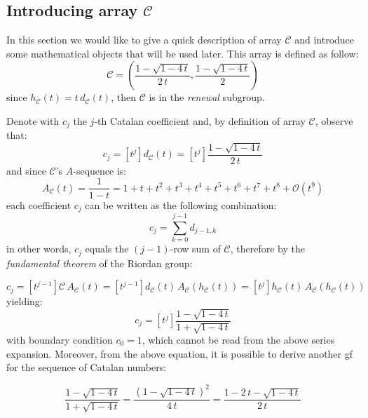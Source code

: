 \subsection{Introducing array $\mathcal{C}$}

In this section we would like to give a quick description of
array $\mathcal{C}$ and introduce some mathematical objects
that will be used later. This array is defined as follow:
\begin{displaymath}
    \mathcal{C}=\left(\frac{1-\sqrt{1-4\,t}}{2\,t},
        \frac{1-\sqrt{1-4\,t}}{2}\right)
\end{displaymath}
since $h_{\mathcal{C}}(t)=t\,d_{\mathcal{C}}(t)$, then $\mathcal{C}$
is in the \emph{renewal} subgroup.

Denote with $c_{j}$ the $j$-th Catalan coefficient and, 
by definition of array $\mathcal{C}$, observe that:
\begin{displaymath}
    c_{j} = [t^{j}]d_{\mathcal{C}}(t)= [t^{j}]\frac{1-\sqrt{1-4\,t}}{2\,t}
\end{displaymath}
and since $\mathcal{C}$'s $A$-sequence is:
\begin{displaymath}
    A_{\mathcal{C}}(t)=\frac{1}{1-t}=1+t+t^{2}+t^{3}+t^{4}+t^{5}+t^{6}+t^{7}+t^{8}+
        \mathcal{O}(t^{9})
\end{displaymath}
each coefficient $c_{j}$ can be written as the following combination:
\begin{displaymath}
    c_{j} = \sum_{k=0}^{j-1}{d_{j-1,k}}
\end{displaymath}
in other words, $c_{j}$ equals the $(j-1)$-row sum of $\mathcal{C}$, 
therefore by the \emph{fundamental theorem} of the Riordan group:

\begin{displaymath}
    c_{j} = [t^{j-1}]\mathcal{C}\,A_{\mathcal{C}}(t)
          = [t^{j-1}]d_{\mathcal{C}}(t)\,A_{\mathcal{C}}(h_{\mathcal{C}}(t))
          = [t^{j}]h_{\mathcal{C}}(t)\,A_{\mathcal{C}}(h_{\mathcal{C}}(t))
\end{displaymath}
yielding:
\begin{displaymath}
    c_{j} = [t^{j}]\frac{1-\sqrt{1-4 \, t}}{1+\sqrt{1-4 \, t}}
\end{displaymath}
with boundary condition $c_{0}=1$, which cannot be read from the above
series expansion. Moreover, from the above equation, it is possible to derive
another \ac{gf} for the sequence of Catalan numbers:

\begin{displaymath}
    \frac{1-\sqrt{1-4 \, t}}{1+\sqrt{1-4 \, t}}=
    \frac{\left(1-\sqrt{1-4 \, t}\right)^{2}}{4 \, t}=
    \frac{1-2\,t-\sqrt{1-4 \, t}}{2 \, t}
\end{displaymath}

